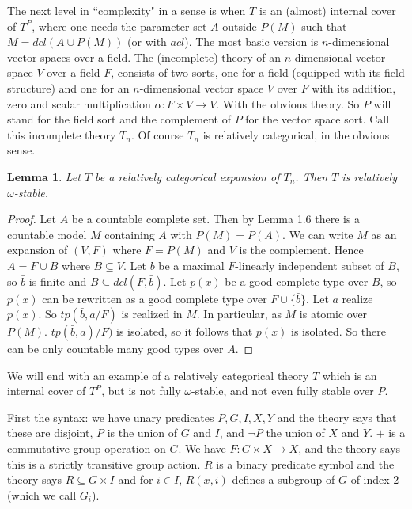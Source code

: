 \documentclass[12pt]{article}
\newtheorem{Lemma}[Theorem]{Lemma}
\begin{document}
The next level in ``complexity" in a sense is when $T$ is an (almost) internal cover of $T^{P}$, where one needs the parameter set $A$ outside $P(M)$  such that $M = dcl(A\cup P(M))$  (or with $acl$).
The most basic version is $n$-dimensional vector spaces over a field.  The (incomplete) theory of an $n$-dimensional vector space $V$ over a field $F$, consists of two sorts, one for a field  (equipped with its field structure) and one for an $n$-dimensional vector space $V$ over $F$ with its addition, zero and scalar multiplication $\alpha: F\times V \to V$.  With the obvious theory. So $P$ will stand for the field sort and the complement of $P$ for the vector space sort. Call this 
incomplete theory $T_{n}$.  Of course $T_{n}$ is relatively categorical, in the obvious sense. 
\begin{Lemma} Let $T$ be a relatively categorical expansion of $T_{n}$. Then $T$ is relatively $\omega$-stable.

\end{Lemma}
\begin{proof} Let $A$ be a countable complete set. Then by  Lemma 1.6 there is a countable model $M$ containing $A$ with $P(M) = P(A)$. We can write $M$ as an expansion of $(V,F)$ where $F = P(M)$ and $V$ is the complement.
Hence $A = F \cup B$ where $B\subseteq V$.  Let ${\bar b}$ be a maximal $F$-linearly independent subset of $B$, so ${\bar b}$ is finite and $B\subseteq dcl(F,{\bar b})$.  Let $p(x)$ be a good complete type over $B$, so $p(x)$ can be rewritten as a good complete type over $F\cup\{\bar b\}$.  Let $a$ realize $p(x)$.  So $tp({\bar b},a/F)$ is realized in $M$. In particular, as $M$ is atomic over $P(M)$. $tp({\bar b},a)/F)$ is isolated, so it follows that $p(x)$ is isolated. So there can be only countable many good types over $A$.


\end{proof}

We will end with an example of a relatively categorical theory $T$ which is an internal cover of $T^{P}$, but is not fully $\omega$-stable, and not even fully stable over $P$.   

 First the syntax: we have unary predicates  $P, G, I, X, Y$ and the theory says that these are disjoint, $P$ is the union of $G$ and $I$, and $\neg P$ the union of $X$ and $Y$. $+$ is a commutative group operation on $G$. 
 We have $F:G\times X \to X$, and the theory says this is a strictly transitive group action.  $R$ is a binary predicate symbol and the theory says $R\subseteq G\times I$ and for $i\in I$, $R(x,i)$ defines a subgroup of $G$ of index $2$ (which we call $G_{i}$).   
\end{document}
